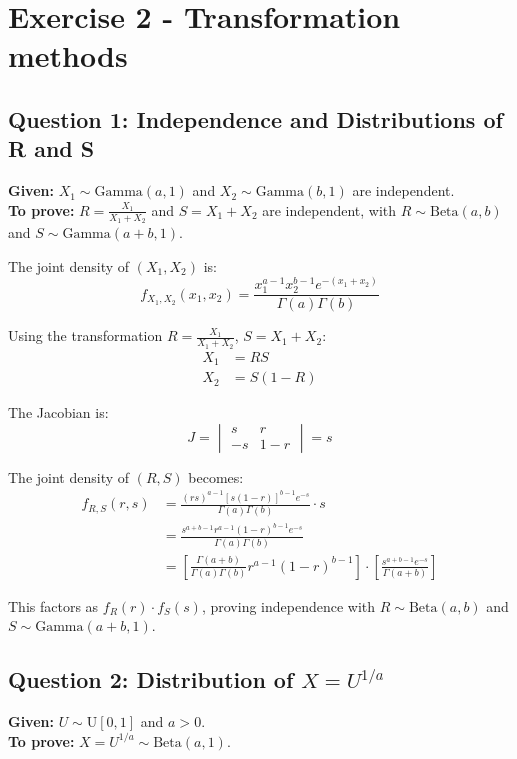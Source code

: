 \section*{Exercise 2 - Transformation methods}

\subsection*{Question 1: Independence and Distributions of R and S}

\textbf{Given:} $X_1 \sim \text{Gamma}(a,1)$ and $X_2 \sim \text{Gamma}(b,1)$ are independent.
\\[2mm]
\textbf{To prove:} $R = \frac{X_1}{X_1 + X_2}$ and $S = X_1 + X_2$ are independent, with $R \sim \text{Beta}(a,b)$ and $S \sim \text{Gamma}(a+b,1)$.

The joint density of $(X_1, X_2)$ is:
\begin{equation*}
f_{X_1,X_2}(x_1, x_2) = \frac{x_1^{a-1} x_2^{b-1} e^{-(x_1+x_2)}}{\Gamma(a)\Gamma(b)}
\end{equation*}

Using the transformation $R = \frac{X_1}{X_1 + X_2}$, $S = X_1 + X_2$:
\begin{align*}
X_1 &= RS \\
X_2 &= S(1-R)
\end{align*}

The Jacobian is:
\begin{equation*}
J = \begin{vmatrix}
s & r \\
-s & 1-r
\end{vmatrix} = s
\end{equation*}

The joint density of $(R,S)$ becomes:
\begin{align*}
f_{R,S}(r,s) &= \frac{(rs)^{a-1} [s(1-r)]^{b-1} e^{-s}}{\Gamma(a)\Gamma(b)} \cdot s \\
&= \frac{s^{a+b-1} r^{a-1} (1-r)^{b-1} e^{-s}}{\Gamma(a)\Gamma(b)} \\
&= \left[\frac{\Gamma(a+b)}{\Gamma(a)\Gamma(b)} r^{a-1}(1-r)^{b-1}\right] \cdot \left[\frac{s^{a+b-1} e^{-s}}{\Gamma(a+b)}\right]
\end{align*}

This factors as $f_R(r) \cdot f_S(s)$, proving independence with $R \sim \text{Beta}(a,b)$ and $S \sim \text{Gamma}(a+b,1)$.

\subsection*{Question 2: Distribution of $X = U^{1/a}$}
\textbf{Given:} $U \sim \text{U}[0,1]$ and $a > 0$.
\\[2mm]
\textbf{To prove:} $X = U^{1/a} \sim \text{Beta}(a,1)$.

